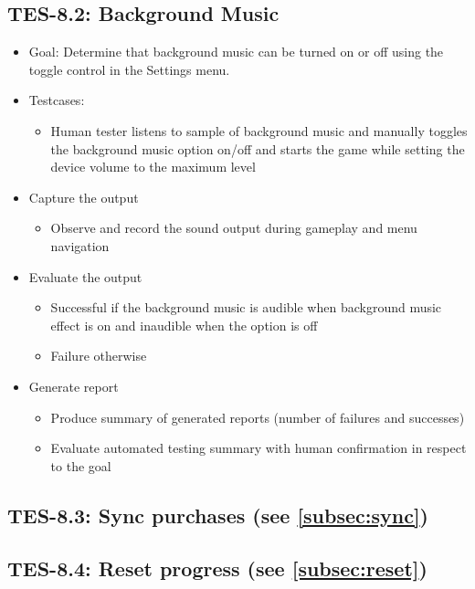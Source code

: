 \subsection{TES-8.2: Background Music}
\begin{itemize}
\item Goal: Determine that background music can be turned on or off using the toggle control in the Settings menu.

\item Testcases: 
\begin{itemize}
\item Human tester listens to sample of background music and manually toggles the background music option on/off and starts the game while setting the device volume to the maximum level
\end{itemize}

\item Capture the output 
\begin{itemize}
\item Observe and record the sound output during gameplay and menu navigation
\end{itemize}

\item Evaluate the output 
\begin{itemize}
\item Successful if the background music is audible when background music effect is on and inaudible when the option is off
\item Failure otherwise
\end{itemize}

\item Generate report 
\begin{itemize}
\item Produce summary of generated reports (number of failures and successes)
\item Evaluate automated testing summary with human confirmation in respect to the goal
\end{itemize}
\end{itemize}

\subsection{TES-8.3: Sync purchases (see \ref{subsec:sync})}
\subsection{TES-8.4: Reset progress  (see \ref{subsec:reset})}
